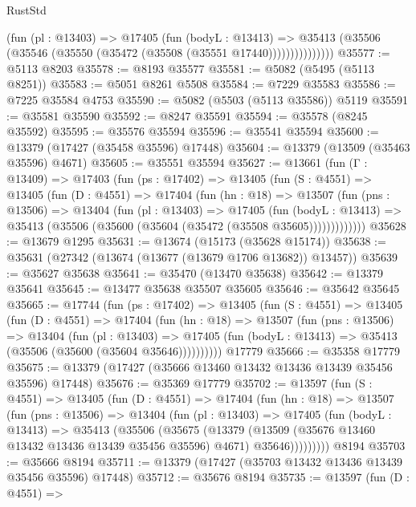 \begin{lexlean}{RustStd}
\begin{coremodule}
                  (fun (pl : @13403) =>
                  @17405
                    (fun (bodyL : @13413) =>
                    @35413 (@35506 (@35546 (@35550 (@35472 (@35508 (@35551 @17440)))))))))))))))
@35577 := @5113 @8203
@35578 := @8193 @35577
@35581 := @5082 (@5495 (@5113 @8251))
@35583 := @5051 @8261 @5508
@35584 := @7229 @35583
@35586 := @7225 @35584 @4753
@35590 := @5082 (@5503 (@5113 @35586)) @5119
@35591 := @35581 @35590
@35592 := @8247 @35591
@35594 := @35578 (@8245 @35592)
@35595 := @35576 @35594
@35596 := @35541 @35594
@35600 := @13379 (@17427 (@35458 @35596) @17448)
@35604 := @13379 (@13509 (@35463 @35596) @4671)
@35605 := @35551 @35594
@35627 := @13661
    (fun (Γ : @13409) =>
    @17403
      (fun (ps : @17402) =>
      @13405
        (fun (S : @4551) =>
        @13405
          (fun (D : @4551) =>
          @17404
            (fun (hn : @18) =>
            @13507
              (fun (pns : @13506) =>
              @13404
                (fun (pl : @13403) =>
                @17405
                  (fun (bodyL : @13413) =>
                  @35413 (@35506 (@35600 (@35604 (@35472 (@35508 @35605)))))))))))))
@35628 := @13679 @1295
@35631 := @13674 (@15173 (@35628 @15174))
@35638 := @35631 (@27342 (@13674 (@13677 (@13679 @1706 @13682)) @13457))
@35639 := @35627 @35638
@35641 := @35470 (@13470 @35638)
@35642 := @13379 @35641
@35645 := @13477 @35638 @35507 @35605
@35646 := @35642 @35645
@35665 := @17744
    (fun (ps : @17402) =>
    @13405
      (fun (S : @4551) =>
      @13405
        (fun (D : @4551) =>
        @17404
          (fun (hn : @18) =>
          @13507
            (fun (pns : @13506) =>
            @13404
              (fun (pl : @13403) =>
              @17405 (fun (bodyL : @13413) => @35413 (@35506 (@35600 (@35604 @35646))))))))))
    @17779
@35666 := @35358 @17779
@35675 := @13379 (@17427 (@35666 @13460 @13432 @13436 @13439 @35456 @35596) @17448)
@35676 := @35369 @17779
@35702 := @13597
    (fun (S : @4551) =>
    @13405
      (fun (D : @4551) =>
      @17404
        (fun (hn : @18) =>
        @13507
          (fun (pns : @13506) =>
          @13404
            (fun (pl : @13403) =>
            @17405
              (fun (bodyL : @13413) =>
              @35413
                (@35506
                  (@35675
                    (@13379
                      (@13509 (@35676 @13460 @13432 @13436 @13439 @35456 @35596) @4671)
                      @35646)))))))))
    @8194
@35703 := @35666 @8194
@35711 := @13379 (@17427 (@35703 @13432 @13436 @13439 @35456 @35596) @17448)
@35712 := @35676 @8194
@35735 := @13597
    (fun (D : @4551) =>

\end{coremodule}
\end{lexlean}
